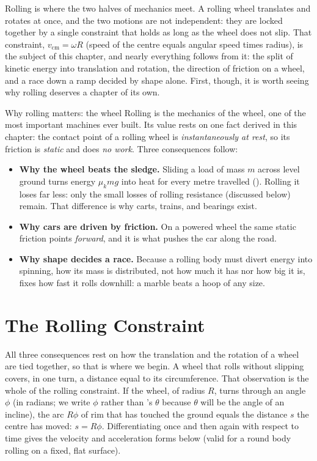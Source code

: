 \label{ch:rolling}

Rolling is where the two halves of mechanics meet. A rolling wheel translates and rotates at once, and the
two motions are not independent: they are locked together by a single constraint that holds as long as the
wheel does not slip. That constraint, $v_{\text{cm}}=\omega R$ (speed of the centre equals angular speed
times radius), is the subject of this chapter, and nearly everything follows from it: the split of kinetic
energy into translation and rotation, the direction of friction on a wheel, and a race down a ramp decided
by shape alone. First, though, it is worth seeing why rolling deserves a chapter of its own.

\begin{motivbox}{Why rolling matters: the wheel}
Rolling is the mechanics of the wheel, one of the most important machines ever built. Its value rests on one fact derived in this chapter: the contact point of a rolling wheel
is \emph{instantaneously at rest}, so its friction is \emph{static} and does \emph{no work}. Three
consequences follow:
\begin{itemize}
\item \textbf{Why the wheel beats the sledge.} Sliding a load of mass $m$ across level ground turns energy
$\mu_k mg$ into heat for every metre travelled (). Rolling it loses far less: only the
small losses of rolling resistance (discussed below) remain. That difference is why carts, trains, and
bearings exist.
\item \textbf{Why cars are driven by friction.} On a powered wheel the same static friction points
\emph{forward}, and it is what pushes the car along the road.
\item \textbf{Why shape decides a race.} Because a rolling body must divert energy into spinning, how its
mass is distributed, not how much it has nor how big it is, fixes how fast it rolls downhill: a marble
beats a hoop of any size.
\end{itemize}
\end{motivbox}

\section{The Rolling Constraint}

All three consequences rest on how the translation and the rotation of a wheel are tied together, so that is
where we begin. A wheel that rolls without slipping covers, in one turn, a distance equal to its
circumference. That observation is the whole of the rolling constraint. If the wheel, of radius $R$, turns
through an angle $\phi$ (in radians; we write $\phi$ rather than 's $\theta$ because
$\theta$ will be the angle of an incline), the arc $R\phi$ of rim that has touched the ground equals the
distance $s$ the centre has moved: $s=R\phi$. Differentiating once and then again with respect to time gives
the velocity and acceleration forms below (valid for a round body rolling on a fixed, flat surface).

